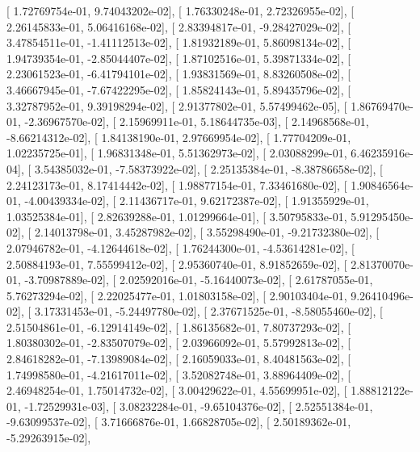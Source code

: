 \documentclass{article}
\begin{document}
       [  1.72769754e-01,   9.74043202e-02],
       [  1.76330248e-01,   2.72326955e-02],
       [  2.26145833e-01,   5.06416168e-02],
       [  2.83394817e-01,  -9.28427029e-02],
       [  3.47854511e-01,  -1.41112513e-02],
       [  1.81932189e-01,   5.86098134e-02],
       [  1.94739354e-01,  -2.85044407e-02],
       [  1.87102516e-01,   5.39871334e-02],
       [  2.23061523e-01,  -6.41794101e-02],
       [  1.93831569e-01,   8.83260508e-02],
       [  3.46667945e-01,  -7.67422295e-02],
       [  1.85824143e-01,   5.89435796e-02],
       [  3.32787952e-01,   9.39198294e-02],
       [  2.91377802e-01,   5.57499462e-05],
       [  1.86769470e-01,  -2.36967570e-02],
       [  2.15969911e-01,   5.18644735e-03],
       [  2.14968568e-01,  -8.66214312e-02],
       [  1.84138190e-01,   2.97669954e-02],
       [  1.77704209e-01,   1.02235725e-01],
       [  1.96831348e-01,   5.51362973e-02],
       [  2.03088299e-01,   6.46235916e-04],
       [  3.54385032e-01,  -7.58373922e-02],
       [  2.25135384e-01,  -8.38786658e-02],
       [  2.24123173e-01,   8.17414442e-02],
       [  1.98877154e-01,   7.33461680e-02],
       [  1.90846564e-01,  -4.00439334e-02],
       [  2.11436717e-01,   9.62172387e-02],
       [  1.91355929e-01,   1.03525384e-01],
       [  2.82639288e-01,   1.01299664e-01],
       [  3.50795833e-01,   5.91295450e-02],
       [  2.14013798e-01,   3.45287982e-02],
       [  3.55298490e-01,  -9.21732380e-02],
       [  2.07946782e-01,  -4.12644618e-02],
       [  1.76244300e-01,  -4.53614281e-02],
       [  2.50884193e-01,   7.55599412e-02],
       [  2.95360740e-01,   8.91852659e-02],
       [  2.81370070e-01,  -3.70987889e-02],
       [  2.02592016e-01,  -5.16440073e-02],
       [  2.61787055e-01,   5.76273294e-02],
       [  2.22025477e-01,   1.01803158e-02],
       [  2.90103404e-01,   9.26410496e-02],
       [  3.17331453e-01,  -5.24497780e-02],
       [  2.37671525e-01,  -8.58055460e-02],
       [  2.51504861e-01,  -6.12914149e-02],
       [  1.86135682e-01,   7.80737293e-02],
       [  1.80380302e-01,  -2.83507079e-02],
       [  2.03966092e-01,   5.57992813e-02],
       [  2.84618282e-01,  -7.13989084e-02],
       [  2.16059033e-01,   8.40481563e-02],
       [  1.74998580e-01,  -4.21617011e-02],
       [  3.52082748e-01,   3.88964409e-02],
       [  2.46948254e-01,   1.75014732e-02],
       [  3.00429622e-01,   4.55699951e-02],
       [  1.88812122e-01,  -1.72529931e-03],
       [  3.08232284e-01,  -9.65104376e-02],
       [  2.52551384e-01,  -9.63099537e-02],
       [  3.71666876e-01,   1.66828705e-02],
       [  2.50189362e-01,  -5.29263915e-02],
\end{document}
